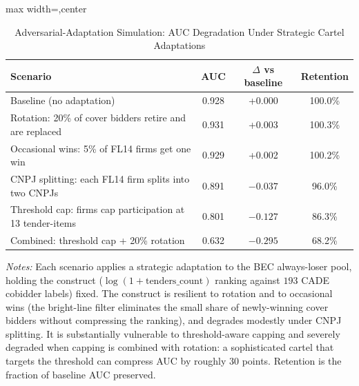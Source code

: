\begin{table}[htbp]
\centering
\caption{Adversarial-Adaptation Simulation: AUC Degradation Under Strategic Cartel Adaptations}
\label{tab:adversarial_adaptation}
\footnotesize
\begin{adjustbox}{max width=\textwidth,center}
\begin{tabular}{p{8cm}ccc}
\toprule
Scenario & AUC & $\Delta$ vs baseline & Retention \\
\midrule
Baseline (no adaptation) & 0.928 & +0.000 & 100.0\% \\
Rotation: 20\% of cover bidders retire and are replaced & 0.931 & +0.003 & 100.3\% \\
Occasional wins: 5\% of FL14 firms get one win & 0.929 & +0.002 & 100.2\% \\
CNPJ splitting: each FL14 firm splits into two CNPJs & 0.891 & $-0.037$ & 96.0\% \\
Threshold cap: firms cap participation at 13 tender-items & 0.801 & $-0.127$ & 86.3\% \\
Combined: threshold cap + 20\% rotation & 0.632 & $-0.295$ & 68.2\% \\
\bottomrule
\end{tabular}
\end{adjustbox}

\smallskip
{\footnotesize\textit{Notes:} Each scenario applies a strategic
adaptation to the BEC always-loser pool, holding the construct
($\log(1{+}\text{tenders\_count})$ ranking against $193$ CADE
cobidder labels) fixed. The construct is resilient to rotation
and to occasional wins (the bright-line filter eliminates the
small share of newly-winning cover bidders without compressing
the ranking), and degrades modestly under CNPJ splitting. It is
substantially vulnerable to threshold-aware capping and severely
degraded when capping is combined with rotation: a sophisticated
cartel that targets the threshold can compress AUC by roughly
$30$ points. Retention is the fraction of baseline AUC preserved.\par}
\end{table}
